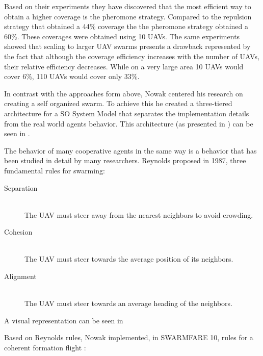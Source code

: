 Based on their experiments they have discovered that the most efficient way to
obtain a higher coverage is the pheromone strategy. Compared to the repulsion 
strategy that obtained a 44\% coverage the the pheromone strategy obtained a 
60\%. These coverages were obtained using 10 UAVs. The same experiments showed
that scaling to larger UAV swarms presents a drawback represented by the fact
that although the coverage efficiency increases with the number of UAVs, 
their relative efficiency decreases. While on a very large area 10 UAVs would
cover 6\%, 110 UAVs would cover only 33\%.

In contrast with the approaches form above, Nowak centered his research on 
creating a self organized swarm. To achieve this he created a three-tiered architecture
for a SO System Model that separates the implementation 
details from the real world agents behavior. This architecture (as presented in
  \cite{so}) can be seen in  .

\newpage

The behavior of many cooperative agents in the same way is a behavior that
has been studied in detail by many researchers. Reynolds proposed in 1987, 
three fundamental rules for swarming: \cite{swarmrules}

\begin{description}
\item [Separation] \hfill \\ The UAV must steer away from the nearest neighbors to avoid crowding.
\item [Cohesion] \hfill \\ The UAV must steer towards the average position of its neighbors.
\item [Alignment] \hfill \\ The UAV must steer towards an average heading of the neighbors.
\end{description}

A visual representation can be seen in 


Based on Reynolds rules, Nowak implemented, in SWARMFARE 10, rules for a coherent
formation flight \cite{so}:

